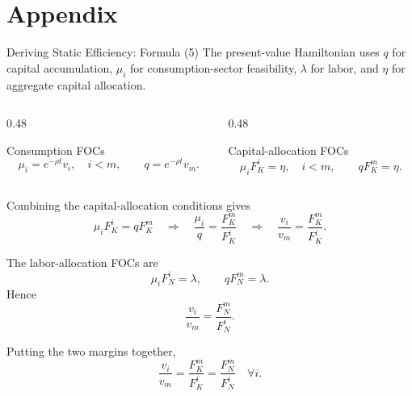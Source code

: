 \section{Appendix}

\begin{frame}[label=appendixstatic]{Deriving Static Efficiency: Formula (5)}
  \scriptsize
  The present-value Hamiltonian uses $q$ for capital accumulation, $\mu_i$ for
  consumption-sector feasibility, $\lambda$ for labor, and $\eta$ for aggregate
  capital allocation.

  \vspace{0.06cm}
  \begin{columns}[T,onlytextwidth]
    \begin{column}{0.48\textwidth}
      \begin{block}{Consumption FOCs}
        \vspace{-0.16cm}
        \[
          \mu_i=e^{-\rho t}v_i,\quad i<m,
          \qquad
          q=e^{-\rho t}v_m .
        \]
        \vspace{-0.34cm}
      \end{block}
    \end{column}
    \begin{column}{0.48\textwidth}
      \begin{block}{Capital-allocation FOCs}
        \vspace{-0.16cm}
        \[
          \mu_iF_K^i=\eta,\quad i<m,
          \qquad
          qF_K^m=\eta .
        \]
        \vspace{-0.34cm}
      \end{block}
    \end{column}
  \end{columns}

  \vspace{0.04cm}
  Combining the capital-allocation conditions gives
  \[
    \mu_iF_K^i=qF_K^m
    \quad\Longrightarrow\quad
    \frac{\mu_i}{q}=\frac{F_K^m}{F_K^i}
    \quad\Longrightarrow\quad
    \frac{v_i}{v_m}=\frac{F_K^m}{F_K^i}.
  \]

  The labor-allocation FOCs are
  \[
    \mu_iF_N^i=\lambda,\qquad qF_N^m=\lambda .
  \]
  Hence
  \[
    \frac{v_i}{v_m}=\frac{F_N^m}{F_N^i}.
  \]

  Putting the two margins together,
  \[
    \boxed{
      \frac{v_i}{v_m}
      =
      \frac{F_K^m}{F_K^i}
      =
      \frac{F_N^m}{F_N^i}
      \quad \forall i
    }.
  \]

  \hyperlink{efficiencycondition}{}
\end{frame}


